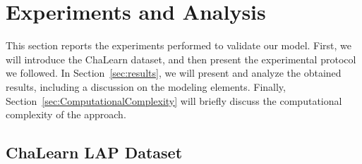 

\section{Experiments and Analysis}

This section reports the experiments performed to validate our model.
First, we will introduce the ChaLearn dataset, and then present the experimental protocol we followed.
In Section~\ref{sec:results}, we will present and analyze the obtained results, including a discussion
on the modeling elements.
Finally, Section~\ref{sec:ComputationalComplexity} will briefly discuss the computational complexity of the approach.




\subsection{ChaLearn LAP Dataset}
\label{sec:chalearn}

